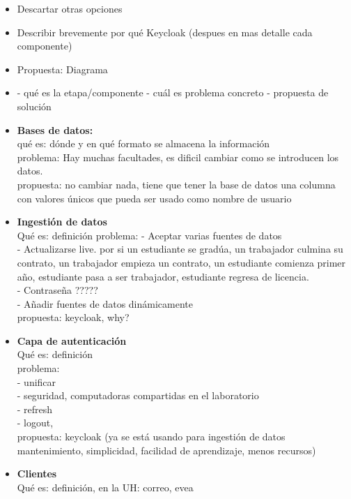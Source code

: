 \begin{itemize}
	\item Descartar otras opciones
	\item Describir brevemente por qué Keycloak (despues en mas detalle cada componente)
	\item Propuesta: Diagrama
	\\
	\item
	-	qué es la etapa/componente
	-	cuál es problema concreto
	-	propuesta de solución
	\\
	\item \textbf{	Bases de datos: }
	\\
	qué es: dónde y en qué formato se almacena la información\\
	problema: Hay muchas facultades, es dificil cambiar como se introducen los datos. \\
	propuesta: no cambiar nada, tiene que tener la base de datos una columna con valores únicos que pueda ser usado como nombre de usuario
	\\
	\item \textbf{Ingestión de datos}
	\\
	Qué es: definición
	problema:
	- Aceptar varias fuentes de datos\\
	- Actualizarse live. por si un estudiante se gradúa, un trabajador culmina su contrato, un trabajador empieza un contrato, un estudiante comienza primer año, estudiante pasa a ser trabajador, estudiante regresa de licencia.\\
	- Contraseña ?????\\
	- Añadir fuentes de datos dinámicamente\\
	propuesta: keycloak, why?
	\\
	\item \textbf{Capa de autenticación}\\
	Qué es: definición\\
	problema:\\
	- unificar\\
	- seguridad, computadoras compartidas en el laboratorio\\
	- refresh\\
	- logout, \\
	propuesta: keycloak (ya se está usando para ingestión de datos mantenimiento, simplicidad, facilidad de aprendizaje, menos recursos)
	\\
	\item \textbf{Clientes}\\
	Qué es: definición, en la UH: correo, evea\\

\end{itemize}
